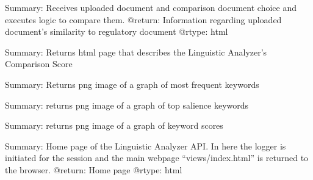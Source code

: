 \documentclass[letterpaper,10pt,english]{sphinxmanual}
\begin{document}
\begin{fulllineitems}
\label{\detokenize{app:app.analyze}}
Summary: Receives uploaded document and comparison document choice and executes logic to compare them.
@return: Information regarding uploaded document’s similarity to regulatory document
@rtype: html

\end{fulllineitems}


\begin{fulllineitems}
\label{\detokenize{app:app.comparisoninfo}}
Summary: Returns html page that describes the Linguistic Analyzer’s Comparison Score

\end{fulllineitems}


\begin{fulllineitems}
\label{\detokenize{app:app.getkwfreeqimage}}
Summary: Returns png image of a graph of most frequent keywords

\end{fulllineitems}


\begin{fulllineitems}
\label{\detokenize{app:app.getkwsalienceimage}}
Summary: returns png image of a graph of top salience keywords

\end{fulllineitems}


\begin{fulllineitems}
\label{\detokenize{app:app.getkwscoresimage}}
Summary: returns png image of a graph of keyword scores

\end{fulllineitems}


\begin{fulllineitems}
\label{\detokenize{app:app.main}}
Summary: Home page of the Linguistic Analyzer API.
In here the logger is initiated for the session and the main webpage “views/index.html” is returned to the browser.
@return: Home page
@rtype: html

\end{fulllineitems}
\end{document}
